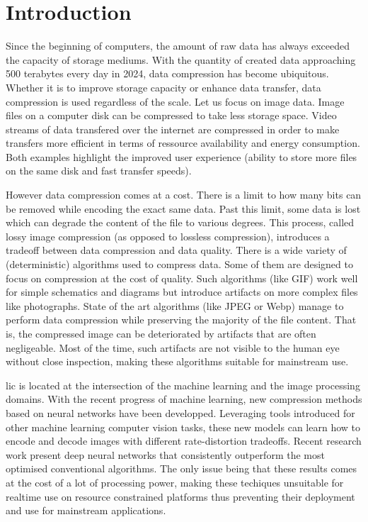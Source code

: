 \chapter*{Introduction}
Since the beginning of computers, the amount of raw data has always exceeded the capacity of storage mediums. With the quantity of created data approaching 500 terabytes every day in 2024, data compression has become ubiquitous. Whether it is to improve storage capacity or enhance data transfer, data compression is used regardless of the scale. Let us focus on image data. Image files on a computer disk can be compressed to take less storage space. Video streams of data transfered over the internet are compressed in order to make transfers more efficient in terms of ressource availability and energy consumption. Both examples highlight the improved user experience (ability to store more files on the same disk and fast transfer speeds).

However data compression comes at a cost. There is a limit to how many bits can be removed while encoding the exact same data. Past this limit, some data is lost which can degrade the content of the file to various degrees. This process, called lossy image compression (as opposed to lossless compression), introduces a tradeoff between data compression and data quality. There is a wide variety of (deterministic) algorithms used to compress data. Some of them are designed to focus on compression at the cost of quality. Such algorithms (like GIF) work well for simple schematics and diagrams but introduce artifacts on more complex files like photographs. State of the art algorithms (like JPEG or Webp) manage to perform data compression while preserving the majority of the file content. That is, the compressed image can be deteriorated by artifacts that are often negligeable. Most of the time, such artifacts are not visible to the human eye without close inspection, making these algorithms suitable for mainstream use.

\acrfull{lic} is located at the intersection of the machine learning and the image processing domains. With the recent progress of machine learning, new compression methods based on neural networks have been developped. Leveraging tools introduced for other machine learning computer vision tasks, these new models can learn how to encode and decode images with different rate-distortion tradeoffs. Recent research work present deep neural networks that consistently outperform the most optimised conventional algorithms. The only issue being that these results comes at the cost of a lot of processing power, making these techiques unsuitable for realtime use on resource constrained platforms thus preventing their deployment and use for mainstream applications.

